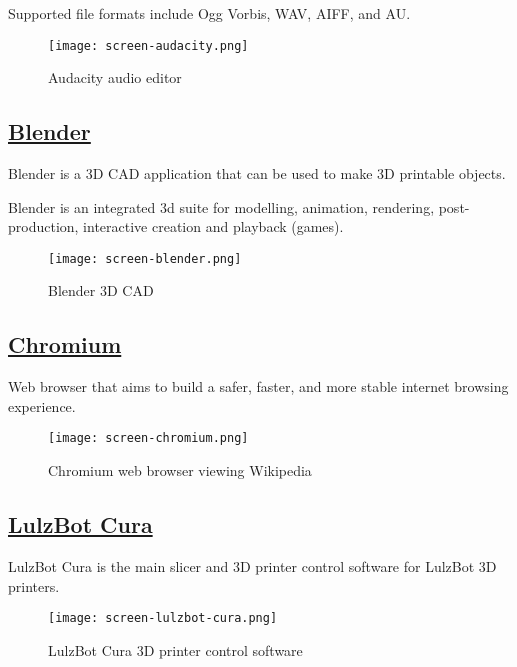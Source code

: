  Supported file formats include Ogg Vorbis, WAV, AIFF, and AU.

\begin{figure}[h!]
\texttt{[image: screen-audacity.png]}
 \caption{Audacity audio editor}
 \label{fig:screen-audacity}
\end{figure}

\subsection{\href{http://www.blender.org/}{Blender}}

Blender is a 3D CAD application that can be used to make 3D printable objects.

 Blender is an integrated 3d suite for modelling, animation, rendering,
 post-production, interactive creation and playback (games).

\begin{figure}[h!]
\texttt{[image: screen-blender.png]}
 \caption{Blender 3D CAD}
 \label{fig:screen-blender}
\end{figure}

\subsection{\href{http://www.chromium.org/Home}{Chromium}}

 Web browser that aims to build a safer, faster, and more stable internet
 browsing experience.
 
\begin{figure}[h!]
\texttt{[image: screen-chromium.png]}
 \caption{Chromium web browser viewing Wikipedia}
 \label{fig:screen-chromium}
\end{figure}

\subsection{\href{http://github.com/alephobjects/Cura}{LulzBot Cura}}

LulzBot Cura is the main slicer and 3D printer control software for LulzBot 3D
printers.

\begin{figure}[h!]
\texttt{[image: screen-lulzbot-cura.png]}
 \caption{LulzBot Cura 3D printer control software}
 \label{fig:screen-lulzbot-cura}
\end{figure}

